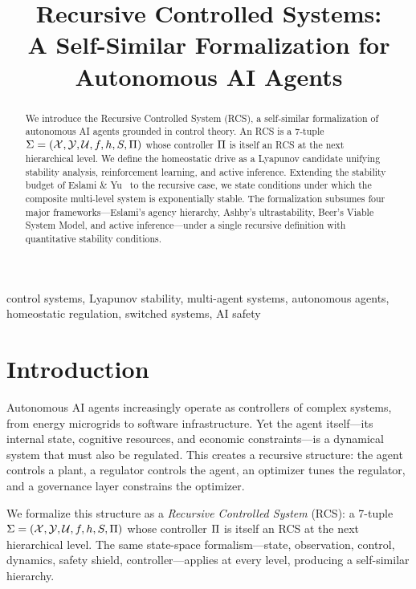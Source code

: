\documentclass[conference]{IEEEtran}
\title{Recursive Controlled Systems:\\
A Self-Similar Formalization for\\Autonomous AI Agents}
\author{
  \IEEEauthorblockN{Carlos D. Escobar-Valbuena}
  \IEEEauthorblockA{
    Maestr\'ia en Inteligencia Artificial (MAIA)\\
    Universidad de los Andes\\
    Bogot\'a, Colombia\\
    carlosdavidescobar@gmail.com
  }
}
\begin{document}
\maketitle

\begin{abstract}
We introduce the Recursive Controlled System (RCS), a self-similar
formalization of autonomous AI agents grounded in control theory.  An RCS is a
7-tuple $\Sigma = (\mathcal{X}, \mathcal{Y}, \mathcal{U}, f, h, S, \Pi)$ whose controller
$\Pi$ is itself an RCS at the next hierarchical level.  We define the
homeostatic drive as a Lyapunov candidate unifying stability analysis,
reinforcement learning, and active inference.  Extending the stability budget
of Eslami \& Yu~\cite{eslami2026control} to the recursive case, we state
conditions under which the composite multi-level system is exponentially
stable.  The formalization subsumes four major frameworks---Eslami's
agency hierarchy, Ashby's ultrastability, Beer's Viable System Model,
and active inference---under a single recursive definition with quantitative
stability conditions.
\end{abstract}

\begin{IEEEkeywords}
  control systems, Lyapunov stability, multi-agent systems, autonomous agents,
  homeostatic regulation, switched systems, AI safety
\end{IEEEkeywords}

\section{Introduction}

Autonomous AI agents increasingly operate as controllers of complex systems,
from energy microgrids to software infrastructure.  Yet the agent itself---its
internal state, cognitive resources, and economic constraints---is a dynamical
system that must also be regulated.  This creates a recursive structure: the
agent controls a plant, a regulator controls the agent, an optimizer tunes the
regulator, and a governance layer constrains the optimizer.

We formalize this structure as a \emph{Recursive Controlled System} (RCS): a
7-tuple $\Sigma = (\mathcal{X}, \mathcal{Y}, \mathcal{U}, f, h, S, \Pi)$ whose controller
$\Pi$ is itself an RCS at the next hierarchical level.  The same
state-space formalism---state, observation, control, dynamics, safety shield,
controller---applies at every level, producing a self-similar hierarchy.
\end{document}
